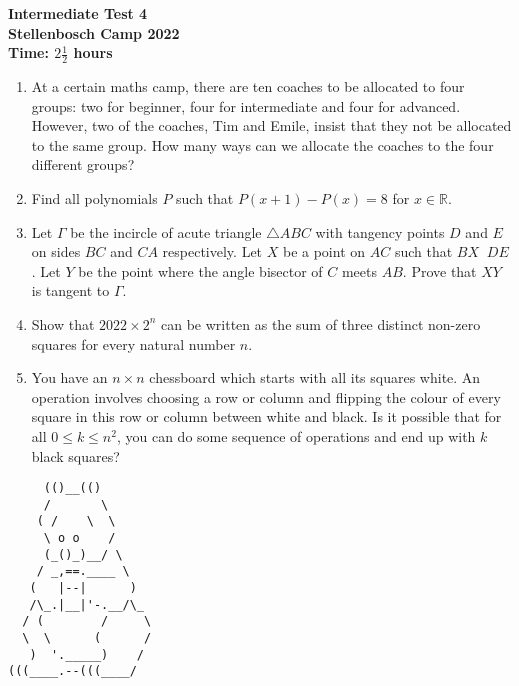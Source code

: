 \documentclass{article}
\begin{document}
\thispagestyle{empty}

\begin{center}
  \textbf{\Large Intermediate Test 4}
  \\ \vspace{1em}
  \textbf{\large Stellenbosch Camp 2022}
  \\ \vspace{1em}
  \textbf{\large Time: $2\frac{1}{2}$ hours}
\end{center}

\bigskip

\begin{enumerate}[itemsep=\fill]

\item %
At a certain maths camp, there are ten coaches to be allocated to four groups: two for beginner, four for intermediate and four for advanced. However, two of the coaches, Tim and Emile, insist that they not be allocated to the same group. How many ways can we allocate the coaches to the four different groups?
 
\item %
Find all polynomials $P$ such that $P(x+1) - P(x) = 8$ for $x\in\mathbb{R}$.

\item %
Let $\Gamma$ be the incircle of acute triangle $\triangle ABC$ with tangency points $D$ and $E$ on sides $BC$ and $CA$ respectively. Let $X$ be a point on $AC$ such that $BX\mathop{||}DE$. Let $Y$ be the point where the angle bisector of $C$ meets $AB$. Prove that $XY$ is tangent to $\Gamma$.

\item %
Show that $2022 \times 2^n$ can be written as the sum of three distinct non-zero squares for every natural number $n$.


\item %
You have an $n \times n$ chessboard which starts with all its squares white.
An operation involves choosing a row or column and flipping the colour of every square in this row or column between white and black.
Is it possible that for all $0 \leq k \leq n^2$, you can do some sequence of operations and end up with $k$ black squares?

\end{enumerate}


\vfill
\centering
\small
\begin{BVerbatim}
     (()__(()
     /       \ 
    ( /    \  \
     \ o o    /
     (_()_)__/ \             
    / _,==.____ \
   (   |--|      )
   /\_.|__|'-.__/\_
  / (        /     \ 
  \  \      (      /
   )  '._____)    /    
(((____.--(((____/
\end{BVerbatim}
\end{document}
